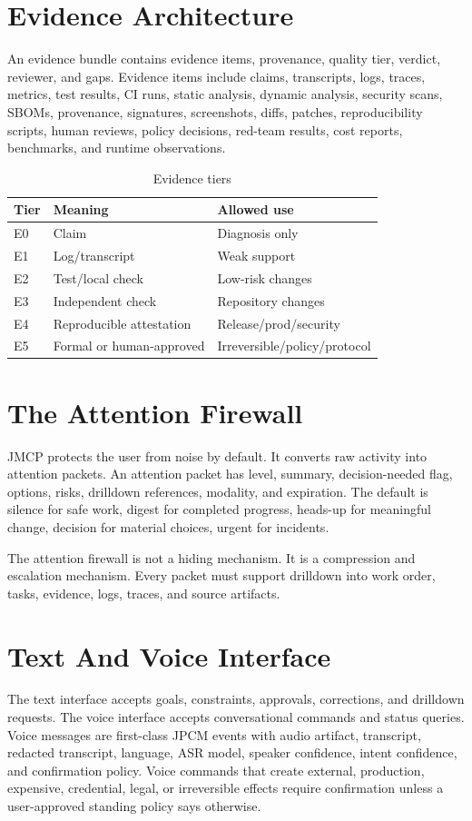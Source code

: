 \documentclass[10pt,journal,onecolumn]{IEEEtran}
\begin{document}
\section{Evidence Architecture}
An evidence bundle contains evidence items, provenance, quality tier, verdict, reviewer, and gaps. Evidence items include claims, transcripts, logs, traces, metrics, test results, CI runs, static analysis, dynamic analysis, security scans, SBOMs, provenance, signatures, screenshots, diffs, patches, reproducibility scripts, human reviews, policy decisions, red-team results, cost reports, benchmarks, and runtime observations.

\begin{table}[!t]
\centering
\caption{Evidence tiers}
\begin{tabular}{lll}
\toprule
Tier & Meaning & Allowed use\\
\midrule
E0 & Claim & Diagnosis only\\
E1 & Log/transcript & Weak support\\
E2 & Test/local check & Low-risk changes\\
E3 & Independent check & Repository changes\\
E4 & Reproducible attestation & Release/prod/security\\
E5 & Formal or human-approved & Irreversible/policy/protocol\\
\bottomrule
\end{tabular}
\end{table}

\section{The Attention Firewall}
JMCP protects the user from noise by default. It converts raw activity into attention packets. An attention packet has level, summary, decision-needed flag, options, risks, drilldown references, modality, and expiration. The default is silence for safe work, digest for completed progress, heads-up for meaningful change, decision for material choices, urgent for incidents.

The attention firewall is not a hiding mechanism. It is a compression and escalation mechanism. Every packet must support drilldown into work order, tasks, evidence, logs, traces, and source artifacts.

\section{Text And Voice Interface}
The text interface accepts goals, constraints, approvals, corrections, and drilldown requests. The voice interface accepts conversational commands and status queries. Voice messages are first-class JPCM events with audio artifact, transcript, redacted transcript, language, ASR model, speaker confidence, intent confidence, and confirmation policy. Voice commands that create external, production, expensive, credential, legal, or irreversible effects require confirmation unless a user-approved standing policy says otherwise.
\end{document}
